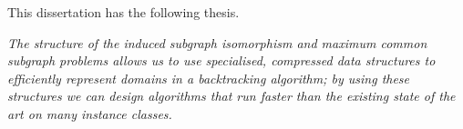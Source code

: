 This dissertation has the following thesis.

\emph{The structure of the induced subgraph isomorphism and maximum common
subgraph problems allows us to use specialised, compressed data structures to
efficiently represent domains in a backtracking algorithm; by using these
structures we can design algorithms that run faster than the existing state of
the art on many instance classes.}
